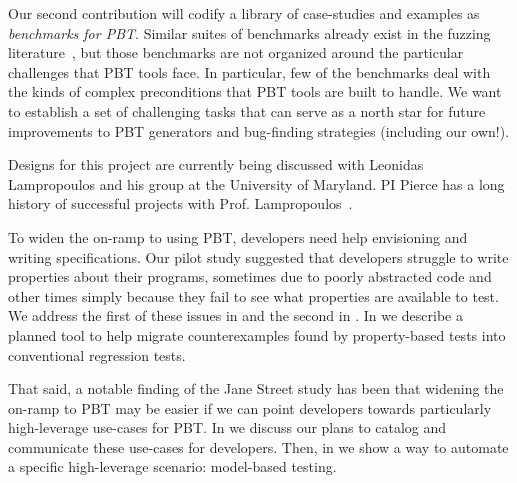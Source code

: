 Our second contribution will codify a library of case-studies and examples as
{\em benchmarks for PBT}. Similar suites of benchmarks already exist in the
fuzzing literature~\cite{hazimeh_magma_2021}, but those benchmarks are not
organized around the particular challenges that PBT tools face. In particular,
few of the benchmarks deal with the kinds of complex preconditions that PBT
tools are built to handle. We want to establish a set of challenging tasks that
can serve as a north star for future improvements to PBT generators and
bug-finding strategies (including our own!).

Designs for this project are currently being discussed with Leonidas
Lampropoulos and his group at the University of Maryland. PI Pierce has a long
history of successful projects with Prof.
Lampropoulos~\cite[etc.]{LuckPOPL,goldstein2021dojudgeatest,lampropoulos_coverage_2019,Lampropoulos&18,OLDlampropoulos19fuzzchick}.

\iflater{} 

\fi

%
%
To widen the on-ramp to using PBT, developers need help envisioning and writing
specifications. Our pilot study suggested that developers struggle to write
properties about their programs, sometimes due to poorly abstracted code and
other times simply because they fail to see what properties are available to
test. We address the first of these issues in  and
the second in .
%
%
In
 we describe a planned tool to help migrate
counterexamples found by property-based tests into conventional regression tests.

That said, a notable finding of the Jane Street study has been that widening the
on-ramp to PBT may be easier if we can point developers towards particularly
high-leverage use-cases for PBT. In  we discuss our plans
to catalog and communicate these use-cases for developers. Then, in
 we show a way to automate a specific high-leverage
scenario: model-based testing.

